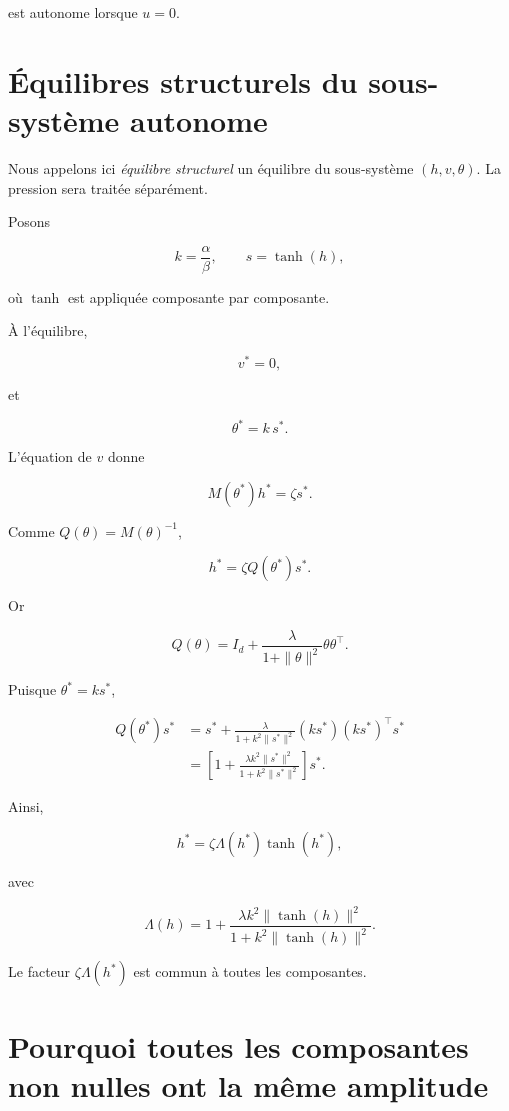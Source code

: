 est autonome lorsque \(u=0\).

\section{Équilibres structurels du sous-système autonome}
\label{annexe-reduction-equilibres}

Nous appelons ici \emph{équilibre structurel} un équilibre du
sous-système \((h,v,\theta)\). La pression sera traitée séparément.

Posons

\[
k=\frac{\alpha}{\beta},
\qquad
s=\tanh(h),
\]

où \(\tanh\) est appliquée composante par composante.

À l'équilibre,

\[
v^\ast=0,
\]

et

\[
\theta^\ast
=
k\,s^\ast.
\]

L'équation de \(v\) donne

\[
M(\theta^\ast)h^\ast
=
\zeta s^\ast.
\]

Comme \(Q(\theta)=M(\theta)^{-1}\),

\[
h^\ast
=
\zeta Q(\theta^\ast)s^\ast.
\]

Or

\[
Q(\theta)
=
I_d
+
\frac{\lambda}{1+\|\theta\|^2}
\theta\theta^\top.
\]

Puisque \(\theta^\ast=ks^\ast\),

\[
\begin{aligned}
Q(\theta^\ast)s^\ast
&=
s^\ast
+
\frac{\lambda}
{1+k^2\|s^\ast\|^2}
(ks^\ast)(ks^\ast)^\top s^\ast
\\
&=
\left[
1+
\frac{\lambda k^2\|s^\ast\|^2}
{1+k^2\|s^\ast\|^2}
\right]s^\ast.
\end{aligned}
\]

Ainsi,

\[
h^\ast
=
\zeta\Lambda(h^\ast)\tanh(h^\ast),
\]

avec

\[
\Lambda(h)
=
1+
\frac{\lambda k^2\|\tanh(h)\|^2}
{1+k^2\|\tanh(h)\|^2}.
\]

Le facteur \(\zeta\Lambda(h^\ast)\) est commun à toutes les
composantes.

\section{Pourquoi toutes les composantes non nulles ont la même
amplitude}
\label{annexe-reduction-amplitude-commune}

